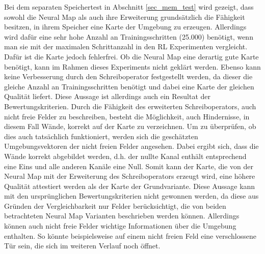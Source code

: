 Bei dem separaten Speichertest in Abschnitt \ref{sec_mem_test} wird gezeigt, dass sowohl die Neural Map als auch ihre Erweiterung grundsätzlich die Fähigkeit besitzen, in ihrem Speicher eine Karte der Umgebung zu erzeugen. Allerdings wird dafür eine sehr hohe Anzahl an Trainingsschritten (25.000) benötigt, wenn man sie mit der maximalen Schrittanzahl in den RL Experimenten vergleicht. Dafür ist die Karte jedoch fehlerfrei. Ob die Neural Map eine derartig gute Karte benötigt, kann im Rahmen dieses Experiments nicht geklärt werden. Ebenso kann keine Verbesserung durch den Schreiboperator festgestellt werden, da dieser die gleiche Anzahl an Trainingsschritten benötigt und dabei eine Karte der gleichen Qualität liefert. Diese Aussage ist allerdings auch ein Resultat der Bewertungskriterien. Durch die Fähigkeit des erweiterten Schreiboperators, auch nicht freie Felder zu beschreiben, besteht die Möglichkeit, auch Hindernisse, in diesem Fall Wände, korrekt auf der Karte zu verzeichnen. Um zu überprüfen, ob dies auch tatsächlich funktioniert, werden sich die geschätzten Umgebungsvektoren der nicht freien Felder angesehen. Dabei ergibt sich, dass die Wände korrekt abgebildet werden, d.h. der nullte Kanal enthält entsprechend eine Eins und alle anderen Kanäle eine Null. Somit kann der Karte, die von der Neural Map mit der Erweiterung des Schreiboperators erzeugt wird, eine höhere Qualität attestiert werden als der Karte der Grundvariante. Diese Aussage kann mit den ursprünglichen Bewertungskriterien nicht gewonnen werden, da diese aus Gründen der Vergleichbarkeit nur Felder berücksichtigt, die von beiden betrachteten Neural Map Varianten beschrieben werden können. Allerdings können auch nicht freie Felder wichtige Informationen über die Umgebung enthalten. So könnte beispielsweise auf einem nicht freien Feld eine verschlossene Tür sein, die sich im weiteren Verlauf noch öffnet.